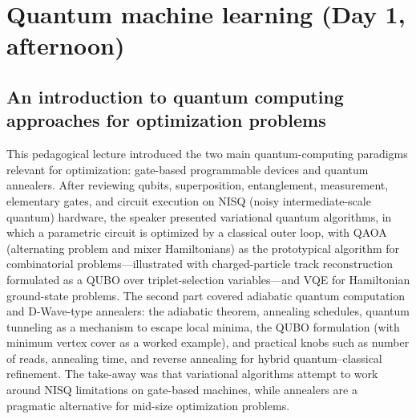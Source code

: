 \section{Quantum machine learning (Day 1, afternoon)}

\subsection{An introduction to quantum computing approaches for optimization problems}
This pedagogical lecture introduced the two main quantum-computing paradigms
relevant for optimization: gate-based programmable devices and quantum
annealers. After reviewing qubits, superposition, entanglement, measurement,
elementary gates, and circuit execution on NISQ (noisy intermediate-scale
quantum) hardware, the speaker presented variational quantum algorithms, in
which a parametric circuit is optimized by a classical outer loop, with QAOA
(alternating problem and mixer Hamiltonians) as the prototypical algorithm for
combinatorial problems---illustrated with charged-particle track reconstruction
formulated as a QUBO over triplet-selection variables---and VQE for
Hamiltonian ground-state problems. The second part covered adiabatic quantum
computation and D-Wave-type annealers: the adiabatic theorem, annealing
schedules, quantum tunneling as a mechanism to escape local minima, the QUBO
formulation (with minimum vertex cover as a worked example), and practical
knobs such as number of reads, annealing time, and reverse annealing for hybrid
quantum--classical refinement. The take-away was that variational algorithms
attempt to work around NISQ limitations on gate-based machines, while annealers
are a pragmatic alternative for mid-size optimization problems.

